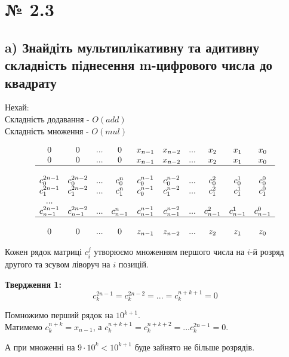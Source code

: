 \documentclass[11pt, a4paper]{article} %
\begin{document}
\section*{№ 2.3}
\subsection*{a) Знайдiть мультиплiкативну та адитивну складнiсть пiднесення m-цифрового
числа до квадрату}

\begin{mdframed}
    Нехай:\\
    Складність додавання - $O(add)$\\
    Складність множення - $O(mul)$
\end{mdframed}

$$\begin{matrix}
    0 & 0 & ... & 0 & x_{n-1} & x_{n-2} & ... & x_2 & x_1 & x_0 \\
    0 & 0 & ... & 0 & x_{n-1} & x_{n-2} & ... & x_2 & x_1 & x_0 \\
    \hline \\
    c_0^{2n-1} & c_0^{2n-2} & ... & c_0^{n} & c_0^{n-1} & c_0^{n-2} & ... & c_0^2 & c_0^1 & c_0^0 \\
    c_1^{2n-1} & c_1^{2n-2} & ... & c_1^{n} & c_0^{n-1} & c_1^{n-2} & ... & c_1^2 & c_1^1 & c_1^0 \\
    ...\\
    c_{n-1}^{2n-1} & c_{n-1}^{2n-2} & ... & c_{n-1}^{n} & c_{n-1}^{n-1} & c_{n-1}^{n-2} & ... & c_{n-1}^2 & c_{n-1}^1 & c_{n-1}^0 \\
    \hline \\
    0 & 0 & ... & 0 & z_{n-1} & z_{n-2} & ... & z_2 & z_1 & z_0
\end{matrix}$$

Кожен рядок матриці $c_i^j$ утворюємо множенням першого числа на $i$-й розряд другого та зсувом ліворуч на $i$ позицій.

\begin{mdframed}[backgroundcolor=violet!15]
    \textbf{Твердження 1:}
    $$c_k^{2n-1} = c_k^{2n-2} = ... = c_k^{n+k+1} = 0$$

    Помножимо перший рядок на $10^{k+1}$. \\
    Матимемо $c_k^{n+k} = x_{n-1}$, а $c_k^{n+k+1} = c_k^{n+k+2} = ... c_k^{2n-1} = 0$.
    
    А при множенні на $9 \cdot 10^k < 10^{k+1}$ буде зайнято не більше розрядів.
    \qedsymbol
\end{mdframed}
\end{document}
